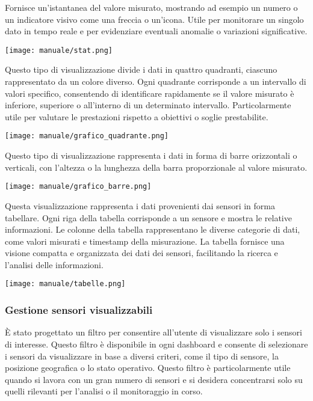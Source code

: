 Fornisce un'istantanea del valore misurato, mostrando ad esempio un numero o un indicatore visivo come una freccia o un'icona. Utile per monitorare un singolo dato in tempo reale e per evidenziare eventuali anomalie o variazioni significative.
\begin{center}
    \texttt{[image: manuale/stat.png]}
\end{center} 

Questo tipo di visualizzazione divide i dati in quattro quadranti, ciascuno rappresentato da un colore diverso. Ogni quadrante corrisponde a un intervallo di valori specifico, consentendo di identificare rapidamente se il valore misurato è inferiore, superiore o all'interno di un determinato intervallo. Particolarmente utile per valutare le prestazioni rispetto a obiettivi o soglie prestabilite.
\begin{center}
    \texttt{[image: manuale/grafico\_quadrante.png]}
\end{center}

Questo tipo di visualizzazione rappresenta i dati in forma di barre orizzontali o verticali, con l'altezza o la lunghezza della barra proporzionale al valore misurato. 
\begin{center}
    \texttt{[image: manuale/grafico\_barre.png]}
\end{center}

Questa visualizzazione rappresenta i dati provenienti dai sensori in forma tabellare. Ogni riga della tabella corrisponde a un sensore e mostra le relative informazioni. Le colonne della tabella rappresentano le diverse categorie di dati, come valori misurati e timestamp della misurazione. La tabella fornisce una visione compatta e organizzata dei dati dei sensori, facilitando la ricerca e l'analisi delle informazioni.
\begin{center}
    \texttt{[image: manuale/tabelle.png]}
\end{center} 


\subsubsection{Gestione sensori visualizzabili}
È stato progettato un filtro per consentire all'utente di visualizzare solo i sensori di interesse. Questo filtro è disponibile in ogni dashboard e consente di selezionare i sensori da visualizzare in base a diversi criteri, come il tipo di sensore, la posizione geografica o lo stato operativo. Questo filtro è particolarmente utile quando si lavora con un gran numero di sensori e si desidera concentrarsi solo su quelli rilevanti per l'analisi o il monitoraggio in corso.


